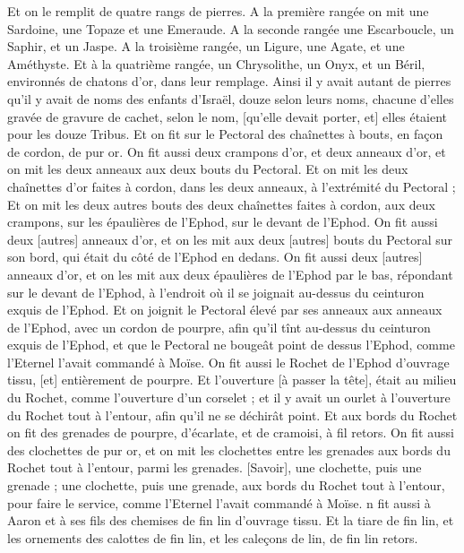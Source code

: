 \begin{multicols}{2}
Et on le remplit de quatre rangs de pierres. A la première rangée on mit une Sardoine, une Topaze et une Emeraude.
A la seconde rangée une Escarboucle, un Saphir, et un Jaspe.
A la troisième rangée, un Ligure, une Agate, et une Améthyste.
Et à la quatrième rangée, un Chrysolithe, un Onyx, et un Béril, environnés de chatons d'or, dans leur remplage.
Ainsi il y avait autant de pierres qu'il y avait de noms des enfants d'Israël, douze selon leurs noms, chacune d'elles gravée de gravure de cachet, selon le nom, [qu'elle devait porter, et] elles étaient pour les douze Tribus.
Et on fit sur le Pectoral des chaînettes à bouts, en façon de cordon, de pur or.
On fit aussi deux crampons d'or, et deux anneaux d'or, et on mit les deux anneaux aux deux bouts du Pectoral.
Et on mit les deux chaînettes d'or faites à cordon, dans les deux anneaux, à l'extrémité du Pectoral ;
Et on mit les deux autres bouts des deux chaînettes faites à cordon, aux deux crampons, sur les épaulières de l'Ephod, sur le devant de l'Ephod.
On fit aussi deux [autres] anneaux d'or, et on les mit aux deux [autres] bouts du Pectoral sur son bord, qui était du côté de l'Ephod en dedans.
On fit aussi deux [autres] anneaux d'or, et on les mit aux deux épaulières de l'Ephod par le bas, répondant sur le devant de l'Ephod, à l'endroit où il se joignait au-dessus du ceinturon exquis de l'Ephod.
Et on joignit le Pectoral élevé par ses anneaux aux anneaux de l'Ephod, avec un cordon de pourpre, afin qu'il tînt au-dessus du ceinturon exquis de l'Ephod, et que le Pectoral ne bougeât point de dessus l'Ephod, comme l'Eternel l'avait commandé à Moïse.
On fit aussi le Rochet de l'Ephod d'ouvrage tissu, [et] entièrement de pourpre.
Et l'ouverture [à passer la tête], était au milieu du Rochet, comme l'ouverture d'un corselet ; et il y avait un ourlet à l'ouverture du Rochet tout à l’entour, afin qu'il ne se déchirât point.
Et aux bords du Rochet on fit des grenades de pourpre, d'écarlate, et de cramoisi, à fil retors.
On fit aussi des clochettes de pur or, et on mit les clochettes entre les grenades aux bords du Rochet tout à l’entour, parmi les grenades.
[Savoir], une clochette, puis une grenade ; une clochette, puis une grenade, aux bords du Rochet tout à l’entour, pour faire le service, comme l'Eternel l'avait commandé à Moïse.
n fit aussi à Aaron et à ses fils des chemises de fin lin d'ouvrage tissu.
Et la tiare de fin lin, et les ornements des calottes de fin lin, et les caleçons de lin, de fin lin retors.

\end{multicols}
